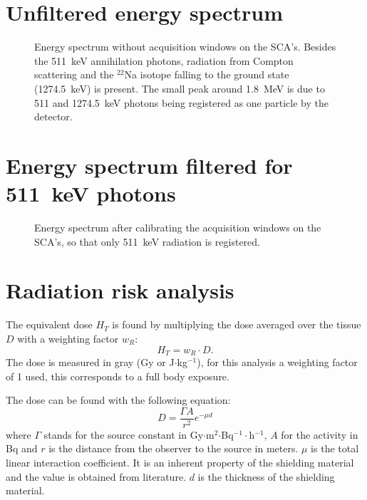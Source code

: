\section{Unfiltered energy spectrum}\label{ap:bg22na}
\begin{figure}[H]
\centering
\resizebox{\columnwidth}{!}{}
\caption{Energy spectrum without acquisition windows on the SCA's. Besides the 511~keV annihilation photons, radiation from Compton scattering and the $^{22}$Na isotope falling to the ground state (1274.5~keV) is present. The small peak around 1.8~MeV is due to 511 and 1274.5~keV photons being registered as one particle by the detector.}
\label{fig:bg22na}
\end{figure}

\section{Energy spectrum filtered for 511~keV photons}\label{ap:bg_511}
\begin{figure}[H]
\centering
\resizebox{\columnwidth}{!}{}
\caption{Energy spectrum after calibrating the acquisition windows on the SCA's, so that only 511~keV radiation is registered.}
\label{fig:bg_511}
\end{figure}

\section{Radiation risk analysis}
The equivalent dose $H_T$ is found by multiplying the dose averaged over the tissue $D$ with a weighting factor $w_R$:
\begin{equation}
H_T = w_R \cdot D.
\label{eq:equiv}
\end{equation}The dose is measured in gray (Gy or J$\cdot$kg$^{-1}$), for this analysis a weighting factor of 1 used, this corresponds to a full body exposure.

The dose can be found with the following equation:
\begin{equation}
D = \frac{\Gamma A}{r^2} e^{-\mu d}
\label{eq:avg}
\end{equation} where $\Gamma$ stands for the source constant in Gy$\cdot$m$^2$$\cdot$Bq$^{-1}\cdot$h$^{-1}$, $A$ for the activity in Bq and $r$ is the distance from the observer to the source in meters. $\mu$ is the total linear interaction coefficient. It is an inherent property of the shielding material and the value is obtained from literature. $d$ is the thickness of the shielding material. 

